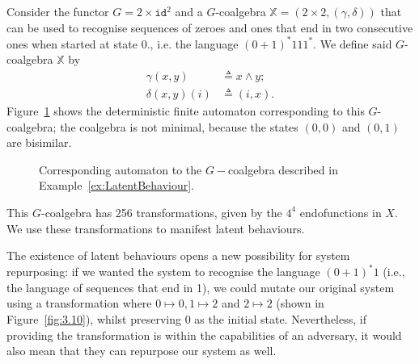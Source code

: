 \begin{example}
\label{ex:LatentBehaviour}
Consider the functor $G=2\times \texttt{id}^2$ and a $G$-coalgebra $\mathbb{X}=(2\times2,(\gamma,\delta))$ that can be used to recognise sequences of zeroes and ones that end in two consecutive ones when started at state 0., i.e. the language $(0+1)^*111^*$. We define said $G$-coalgebra $\mathbb{X}$ by
\begin{align}
\gamma(x,y)&\triangleq x \land y;\\
\delta(x,y)(i)&\triangleq(i,x).
\end{align}
Figure~\ref{fig:ExampleLatent} shows the deterministic finite automaton corresponding to this $G$-coalgebra; the coalgebra is not minimal, because the states $(0,0)$ and $(0,1)$ are bisimilar.
\begin{figure}[t]
\centering
{}
\caption{Corresponding automaton to the $G-$coalgebra described in Example~\ref{ex:LatentBehaviour}.}
\label{fig:ExampleLatent}
\end{figure}

This $G$-coalgebra has 256 transformations, given by the $4^4$ endofunctions in $X$. We use these transformations to manifest latent behaviours.%

{\color{red}
The existence of latent behaviours opens a new possibility for system repurposing: if we wanted the system to recognise the language $(0+1)^*1$ (i.e., the language of sequences that end in 1), we could mutate our original system using a transformation where $0\mapsto0, 1\mapsto2$ and $2\mapsto2$ (shown in Figure~\ref{fig:3.10}), whilst preserving $0$ as the initial state. Nevertheless, if providing the transformation is within the capabilities of an adversary, it would also mean that they can repurpose our system as well. 
}



\end{example}
